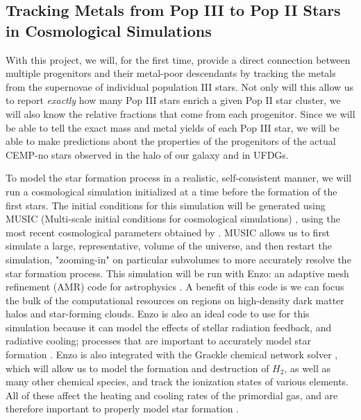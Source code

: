 \documentclass[a4paper, 12pt]{article}
\begin{document}
\subsection{Tracking Metals from Pop III to Pop II Stars in Cosmological Simulations}
\label{subsec:tracer_particles}

With this project, we will, for the first time, provide a direct connection between multiple progenitors and their metal-poor descendants by tracking the metals from the supernovae of individual population III stars. Not only will this allow us to report \textit{exactly} how many Pop III stars enrich a given Pop II star cluster, we will also know the relative fractions that come from each progenitor. Since we will be able to tell the exact mass and metal yields of each Pop III star, we will be able to make predictions about the properties of the progenitors of the actual CEMP-no stars observed in the halo of our galaxy and in UFDGs. 

To model the star formation process in a realistic, self-consistent manner, we will run a cosmological simulation initialized at a time before the formation of the first stars. The initial conditions for this simulation will be generated using MUSIC (Multi-scale initial conditions for cosmological simulations) \citep{Hahn2011}, using the most recent cosmological parameters obtained by \cite{Planck2018}. MUSIC allows us to first simulate a large, representative, volume of the universe, and then restart the simulation, "zooming-in" on particular subvolumes to more accurately resolve the star formation process. This simulation will be run with Enzo: an adaptive mesh refinement (AMR) code for astrophysics \citep{Bryan2014}. A benefit of this code is we can focus the bulk of the computational resources on regions on high-density dark matter halos and star-forming clouds. Enzo is also an ideal code to use for this simulation because it can model the effects of stellar radiation feedback, and radiative cooling; processes that are important to accurately model star formation \citep{...}. Enzo is also integrated with the Grackle chemical network solver \citep{...}, which will allow us to model the formation and destruction of $H_2$, as well as many other chemical species, and track the ionization states of various elements. All of these affect the heating and cooling rates of the primordial gas, and are therefore important to properly model star formation \citep{...}.
\end{document}

